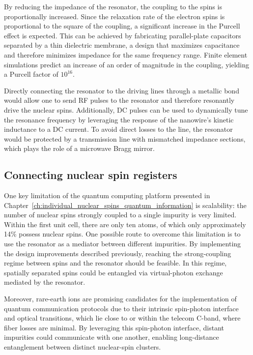 By reducing the impedance of the resonator, the coupling to the spins is proportionally increased. Since the relaxation rate of the electron spins is proportional to the square of the coupling, a significant increase in the Purcell effect is expected. This can be achieved by fabricating parallel-plate capacitors separated by a thin dielectric membrane, a design that maximizes capacitance and therefore minimizes impedance for the same frequency range. Finite element simulations predict an increase of an order of magnitude in the coupling, yielding a Purcell factor of $10^{16}$.

Directly connecting the resonator to the driving lines through a metallic bond would allow one to send RF pulses to the resonator and therefore resonantly drive the nuclear spins. Additionally, DC pulses can be used to dynamically tune the resonance frequency by leveraging the response of the nanowire's kinetic inductance to a DC current. To avoid direct losses to the line, the resonator would be protected by a transmission line with mismatched impedance sections, which plays the role of a microwave Bragg mirror.

\subsection*{Connecting nuclear spin registers}

One key limitation of the quantum computing platform presented in Chapter~\ref{ch:individual_nuclear_spins_quantum_information} is scalability: the number of nuclear spins strongly coupled to a single \Er impurity is very limited. Within the first unit cell, there are only ten \W atoms, of which only approximately 14\% possess nuclear spins. One possible route to overcome this limitation is to use the resonator as a mediator between different \Er impurities. By implementing the design improvements described previously, reaching the strong-coupling regime between \Er spins and the resonator should be feasible. In this regime, spatially separated \Er spins could be entangled via virtual-photon exchange mediated by the resonator.

Moreover, rare-earth ions are promising candidates for the implementation of quantum communication protocols due to their intrinsic spin-photon interface and optical transitions, which lie close to or within the telecom C-band, where fiber losses are minimal. By leveraging this spin-photon interface, distant \Er impurities could communicate with one another, enabling long-distance entanglement between distinct nuclear-spin clusters.

